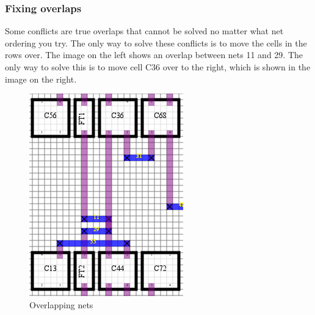 \documentclass[10pt]{article}
\begin{document}
    \subsubsection{Fixing overlaps}

        Some conflicts are true overlaps that cannot be solved no matter what
        net ordering you try. The only way to solve these conflicts is to move
        the cells in the rows over. The image on the left shows an overlap
        between nets 11 and 29. The only way to solve this is to move cell C36
        over to the right, which is shown in the image on the right.

        \begin{figure}[H]
            \centering
            \begin{minipage}{.5\textwidth}
                \centering
                \includegraphics[width=0.75\linewidth]{./route_1_overlap.png}
                \caption{Overlapping nets}
            \end{minipage}%
            \begin{minipage}{.5\textwidth}
                \centering

\end{minipage}
\end{figure}
\end{document}
